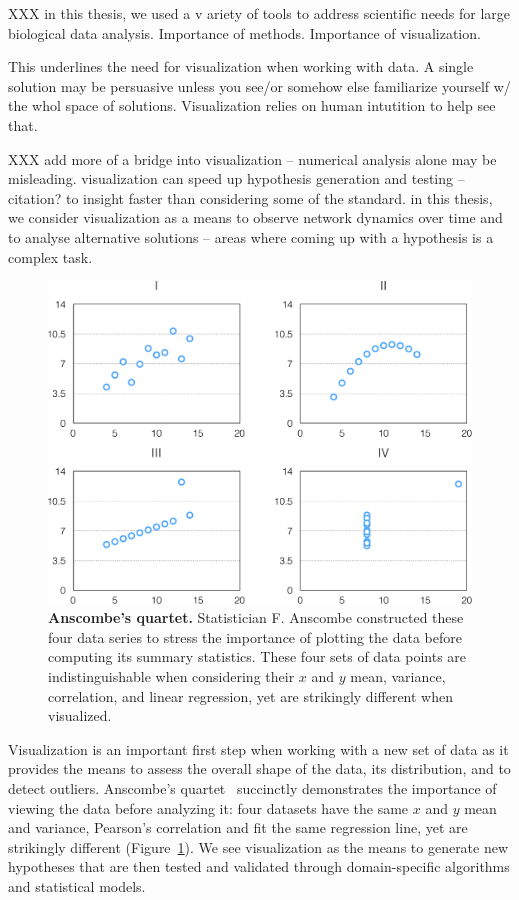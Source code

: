 XXX in this thesis, we used a v ariety of tools to address scientific needs for large biological data analysis. Importance of methods. Importance of visualization.

This underlines the need for visualization when working with data. A single solution may be persuasive unless you see/or somehow else familiarize yourself w/ the whol space of solutions. Visualization relies on human intutition to help see that.

XXX add more of a bridge into visualization -- numerical analysis alone may be misleading. visualization can speed up hypothesis generation and testing -- citation? to insight faster than considering some of the standard. in this thesis, we consider visualization as a means to observe network dynamics over time and to analyse alternative solutions -- areas where coming up with a hypothesis is a complex task.

\begin{figure}[ht]
  \centering
  \includegraphics[width=0.8\linewidth]{figures/anscombes_quartet}
  \caption{\textbf{Anscombe's quartet.} Statistician F. Anscombe constructed these four data series to stress the importance of plotting the data before computing its summary statistics. These four sets of data points are indistinguishable when considering their $x$ and $y$ mean, variance, correlation, and linear regression, yet are strikingly different when visualized.}
  \label{fig:intro:anscombe}
\end{figure}


Visualization is an important first step when working with a new set of data as it provides the means to assess the overall shape of the data, its distribution, and to detect outliers. Anscombe's quartet~\cite{anscombe} succinctly demonstrates the importance of viewing the data before analyzing it: four datasets have the same $x$ and $y$ mean and variance, Pearson's correlation and fit the same regression line, yet are strikingly different (Figure~\ref{fig:intro:anscombe}). We see visualization as the means to generate new hypotheses that are then tested and validated through domain-specific algorithms and statistical models.

